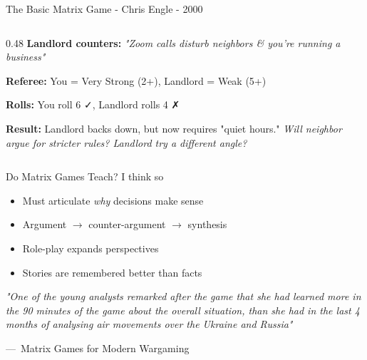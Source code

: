 \documentclass[aspectratio=169]{beamer}
\begin{document}
\begin{frame}{The Basic Matrix Game - Chris Engle - 2000}
\begin{columns}[T]
\begin{column}{0.48\textwidth}
      \vspace{0.1em}
      \textbf{Landlord counters:} \textit{"Zoom calls disturb neighbors \& you're running a business"}

      \vspace{0.1em}
      \textbf{Referee:} You = Very Strong (2+), Landlord = Weak (5+)

      \vspace{0.1em}
      \textbf{Rolls:} You roll 6 ✓, Landlord rolls 4 ✗

      \vspace{0.1em}
      \scriptsize\textbf{Result:} Landlord backs down, but now requires "quiet hours." \textit{Will neighbor argue for stricter rules? Landlord try a different angle?}
    \end{column}
  \end{columns}
\end{frame}

\begin{frame}{Do Matrix Games Teach?}
  I think so
  \begin{itemize}
    \item Must articulate \textit{why} decisions make sense
    \item Argument $\rightarrow$ counter-argument $\rightarrow$ synthesis
    \item Role-play expands perspectives
    \item Stories are remembered better than facts
  \end{itemize}

  \vspace{0.5em}
  \centering
  \small
  \textit{"One of the young analysts remarked after the game that she had learned more in the 90 minutes of the game about the overall situation, than she had in the last 4 months of analysing air movements over the Ukraine and Russia"}

  \vspace{0.3em}
  \scriptsize
  ---~Matrix Games for Modern Wargaming
\end{frame}
\end{document}
